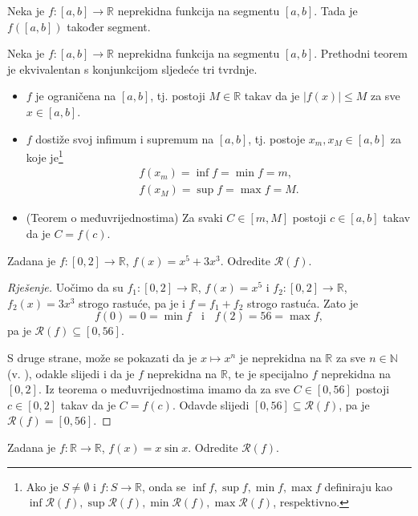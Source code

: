 \begin{remark}
Neka je $f : [a, b]\to \mathbb{R}$ neprekidna funkcija na segmentu $[a, b]$. Tada je $f([a, b])$ također segment.
\end{remark}
\begin{remark}
Neka je $f : [a, b]\to \mathbb{R}$ neprekidna funkcija na segmentu $[a, b]$. Prethodni teorem je ekvivalentan s konjunkcijom sljedeće tri tvrdnje.
\begin{itemize}
\item $f$ je ograničena na $[a, b]$, tj. postoji $M\in \mathbb{R}$ takav da je $|f(x)|\leq M$ za sve $x\in [a, b]$.
\item $f$ dostiže svoj infimum i supremum na $[a, b]$, tj. postoje $x_m, x_M\in [a, b]$ za koje je\footnote{Ako je $S\neq \emptyset$ i $f : S\to \mathbb{R}$, onda se $\inf{f}, \sup{f}, \min{f}, \max{f}$ definiraju kao $\inf{\mathcal{R}(f)}, \sup{\mathcal{R}(f)}, \min{\mathcal{R}(f)}, \max{\mathcal{R}(f)}$, respektivno.} 
\begin{gather*}
f(x_m)=\inf{f}=\min{f}=m,\\
f(x_M)=\sup{f}=\max{f}=M.
\end{gather*}
\item (Teorem o međuvrijednostima) Za svaki $C\in [m, M]$ postoji $c\in [a, b]$ takav da je $C=f(c)$.
\end{itemize}
\end{remark}
\newpage
\begin{exercise}
\label{imgcont1}
Zadana je $f : [0, 2]\to \mathbb{R}$, $f(x)=x^5+3x^3$. Odredite $\mathcal{R}(f)$.
\end{exercise}
\begin{proof}[Rješenje]
Uočimo da su $f_1 : [0, 2]\to \mathbb{R}$, $f(x)=x^5$ i $f_2 : [0, 2]\to \mathbb{R}$, $f_2(x)=3x^3$ strogo rastuće, pa je i $f=f_1+f_2$ strogo rastuća. Zato je $$f(0)=0=\min{f}\;\;\text{ i }\;\;f(2)=56=\max{f},$$
pa je $\mathcal{R}(f)\subseteq [0, 56]$.

S druge strane, može se pokazati da je $x\mapsto x^n$ je neprekidna na $\mathbb{R}$ za sve $n\in \mathbb{N}$ (v. \cite{3}), odakle slijedi i da je $f$ neprekidna na $\mathbb{R}$, te je specijalno $f$ neprekidna na $[0, 2]$. Iz teorema o međuvrijednostima imamo da za sve $C\in [0, 56]$ postoji $c\in [0, 2]$ takav da je $C=f(c)$. Odavde slijedi $[0, 56]\subseteq \mathcal{R}(f)$, pa je $\mathcal{R}(f)=[0, 56]$.
\end{proof}
\begin{exercise}
Zadana je $f : \mathbb{R}\to \mathbb{R}$, $f(x)=x\sin{x}$. Odredite $\mathcal{R}(f)$.
\end{exercise}
